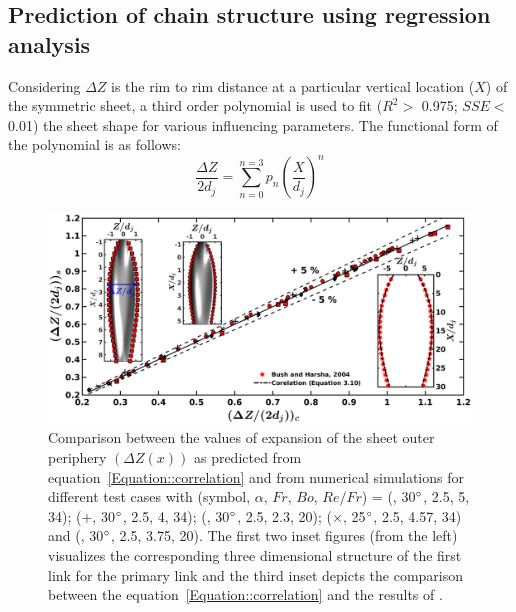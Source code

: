\subsection{Prediction of chain structure using regression analysis}
Considering $\Delta Z$ is the rim to rim distance at a particular vertical location ($X$) of the symmetric sheet, a third order polynomial is used to fit ($R^2 >$ 0.975; $SSE <$ 0.01) the sheet shape for various influencing parameters. The functional form of the polynomial is as follows: 
\begin{equation}\label{Equation::correlation}
\frac{\Delta Z}{2d_j} = \sum_{n = 0}^{n = 3}p_n\left(\frac{X}{d_j}\right)^n
\end{equation}
\begin{figure}[t]
    \centering
    \includegraphics[width=\linewidth]{chapters/jetJet/Figure9}
    \caption{Comparison between the values of expansion of the sheet outer periphery $\left(\Delta Z(x)\right)$ as predicted from equation~\ref{Equation::correlation} and from numerical simulations for different test cases with (symbol, $\alpha$, $Fr$, $Bo$, $Re/Fr$) = (\protect\MarkerSquareRed, 30$\degree$, 2.5, 5, 34); (+, 30$\degree$, 2.5, 4, 34); (\protect \MarkerDiamondBlack, 30$\degree$, 2.5, 2.3, 20); ($\times$, 25$\degree$, 2.5, 4.57, 34) and (\protect \MarkerCircleRed, 30$\degree$, 2.5, 3.75, 20). The first two inset figures (from the left) visualizes the corresponding three dimensional structure of the first link for the primary link and the third inset depicts the comparison between the equation~\ref{Equation::correlation} and the results of \citet{bush2004collision}.}
    \label{Figure::polyfit}
\end{figure}
